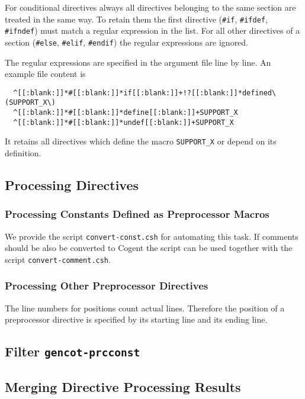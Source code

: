 \documentclass[a4paper]{report}
\newcommand{\code}[1]{\textnormal{\texttt{#1}}}
\begin{document}
For conditional directives always all directives belonging to the same section are treated in the same way.
To retain them the first directive (\code{\#if}, \code{\#ifdef}, \code{\#ifndef}) must match a regular expression
in the list. For all other directives of a section (\code{\#else}, \code{\#elif}, \code{\#endif}) the 
regular expressions are ignored.

The regular expressions are specified in the argument file line by line. An example file content is
\begin{verbatim}
  ^[[:blank:]]*#[[:blank:]]*if[[:blank:]]+!?[[:blank:]]*defined\(SUPPORT_X\)
  ^[[:blank:]]*#[[:blank:]]*define[[:blank:]]+SUPPORT_X
  ^[[:blank:]]*#[[:blank:]]*undef[[:blank:]]+SUPPORT_X
\end{verbatim}
It retains all directives which define the macro \code{SUPPORT\_X} or depend on its definition.

\subsection{Processing Directives}

\subsubsection{Processing Constants Defined as Preprocessor Macros}

We provide the script \code{convert-const.csh} for automating this task. If comments should be also be converted to Cogent 
the script can be used together with the script \code{convert-comment.csh}.

\subsubsection{Processing Other Preprocessor Directives}

The line numbers for positions count actual lines. Therefore the position of a preprocessor directive is specified by its starting line and its ending line. 

\subsection{Filter \code{gencot-prcconst}}

\subsection{Merging Directive Processing Results}
\end{document}
